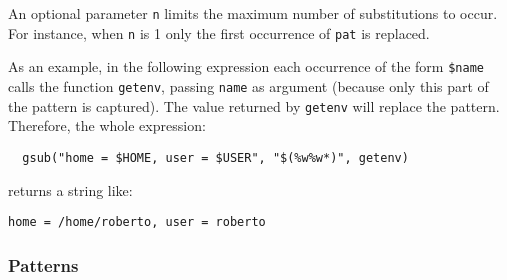 An optional parameter \verb-n- limits
the maximum number of substitutions to occur.
For instance, when \verb-n- is 1 only the first occurrence of
\verb-pat- is replaced.

As an example, in the following expression each occurrence of the form
\verb-$name- calls the function \verb|getenv|,
passing \verb|name| as argument
(because only this part of the pattern is captured).
The value returned by \verb|getenv| will replace the pattern.
Therefore, the whole expression:
\begin{verbatim}
  gsub("home = $HOME, user = $USER", "$(%w%w*)", getenv)
\end{verbatim}
returns a string like:
\begin{verbatim}
home = /home/roberto, user = roberto
\end{verbatim}

\subsubsection*{Patterns} \label{pm}

